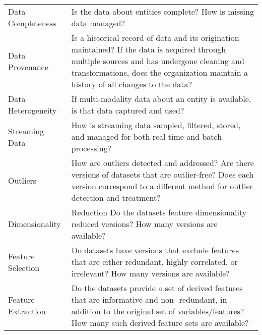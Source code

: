 \begin{table}
\begin{tabular}{p{4.0cm} p{11cm}}
Data Completeness & 
Is the data about entities complete? How is missing data managed? 
\\
Data Provenance & 
Is a historical record of data and its origination maintained? If the data is acquired
through multiple sources and has undergone cleaning and transformations, does
the organization maintain a history of all changes to the data? 
\\
Data Heterogeneity & 
If multi-modality data about an entity is available, is that data captured and used? 
\\
Streaming Data & 
How is streaming data sampled, filtered, stored, and managed for both real-time
and batch processing? 
\\
Outliers & 
How are outliers detected and addressed? Are there versions of datasets that
are outlier-free? Does each version correspond to a different method for outlier
detection and treatment? 
\\
Dimensionality &
Reduction Do the datasets feature dimensionality reduced versions? How many versions are
available? \\
Feature Selection & 
Do datasets have versions that exclude features that are either redundant, highly
correlated, or irrelevant? How many versions are available? 
\\
Feature Extraction & 
Do the datasets provide a set of derived features that are informative and non-
redundant, in addition to the original set of variables/features? How many such
derived feature sets are available? 
\\
\bottomrule
\end{tabular}
\end{table}


